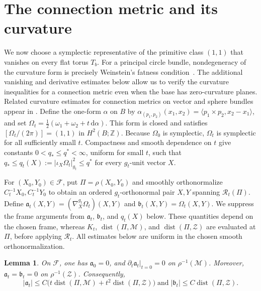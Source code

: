 \documentclass[11pt]{article}
\newtheorem{lemma}[theorem]{Lemma}
\theoremstyle{definition}
\theoremstyle{remark}
\newcommand{\Z}{\mathbb Z}
\newcommand{\cM}{\mathcal M}
\newcommand{\cZ}{\mathcal Z}
\newcommand{\dist}{\operatorname{dist}}
\newcommand{\dd}{\mathrm d}
\begin{document}
\section{The connection metric and its curvature}                                  \label{sec:connection}

We now choose a symplectic representative of the primitive class $(1,1)$
that vanishes on every flat torus $T_b$.  For a principal circle bundle,
nondegeneracy of the curvature form is precisely Weinstein's fatness
condition~\cite{Weinstein1980}.  The additional vanishing and derivative
estimates below allow us to verify the curvature inequalities for a
connection metric even when the base has zero-curvature planes.  Related
curvature estimates for connection metrics on vector and sphere bundles appear in
\cite{StrakeWalschap1990,Tapp2003}.  Define the
one-form $\alpha$ on $B$ by
$\alpha_{(p_1,p_2)}(x_1,x_2)=\langle p_1\times p_2,x_2-x_1\rangle$, and set
$\Omega_t=\tfrac12(\omega_1+\omega_2+t\,\dd\alpha)$.
This form is closed and satisfies
$\left[\Omega_t/(2\pi)\right]=(1,1)$ in $H^2(B;\Z)$.
Because $\Omega_0$ is symplectic, $\Omega_t$ is symplectic for all
sufficiently small $t$.  Compactness and smooth dependence on $t$ give
constants $0<q_*\leq q^*<\infty$, uniform for small $t$, such that
$q_*\leq q_t(X):=|\iota_X\Omega_t|_{g_t}^2\leq q^*$ for every $g_t$-unit
vector $X$.

For $(X_0,Y_0)\in\mathscr F$, put $\Pi=\rho(X_0,Y_0)$ and smoothly
orthonormalize $C_t^{-1}X_0,C_t^{-1}Y_0$ to obtain an ordered
$g_t$-orthonormal pair $X,Y$ spanning $\mathcal R_t(\Pi)$.  Define
$\mathfrak a_t(X,Y)=(\nabla^{g_t}_X\Omega_t)(X,Y)$ and
$\mathfrak b_t(X,Y)=\Omega_t(X,Y)$.  We suppress the frame arguments from
$\mathfrak a_t$, $\mathfrak b_t$, and $q_t(X)$ below.  These quantities
depend on the chosen frame, whereas $K_t$, $\dist(\Pi,\cM)$, and
$\dist(\Pi,\cZ)$ are evaluated at $\Pi$, before applying $\mathcal R_t$.
All estimates below are uniform in the chosen smooth orthonormalization.

\begin{lemma}                                                                       \label{lem:first-order-cancellation}
On $\mathscr F$, one has $\mathfrak a_0=0$, and
$\left.\partial_t\mathfrak a_t\right|_{t=0}=0$ on
$\rho^{-1}(\cM)$.  Moreover, $\mathfrak a_t=\mathfrak b_t=0$ on
$\rho^{-1}(\cZ)$.  Consequently,
\begin{equation}                                                                    \label{eq:a-b-distance-estimates}
 |\mathfrak a_t|\leq C\bigl(t\dist(\Pi,\cM)+t^2\dist(\Pi,\cZ)\bigr)
 \;\text{and}\; |\mathfrak b_t|\leq C\dist(\Pi,\cZ).
\end{equation}
\end{lemma}
\end{document}
